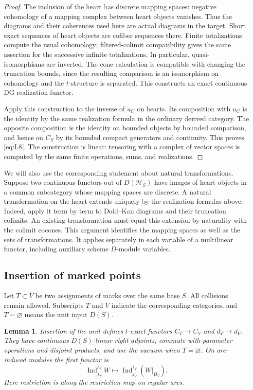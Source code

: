 \documentclass[11pt]{article}
\numberwithin{equation}{section}
\newtheorem{lemma}[theorem]{Lemma}
\theoremstyle{definition}
\theoremstyle{remark}
\begin{document}
\begin{proof}
The inclusion of the heart has discrete mapping spaces: negative
cohomology of a mapping complex between heart objects vanishes.
Thus the diagrams and their coherences used here are actual diagrams
in the target.  Short exact sequences of heart objects are cofiber
sequences there.  Finite totalizations compute the usual cohomology;
filtered-colimit compatibility gives the same assertion for the
successive infinite totalizations.  In particular, quasi-isomorphisms
are inverted.  The cone calculation is compatible with changing the
truncation bounds, since the resulting comparison is an isomorphism
on cohomology and the $t$-structure is separated.  This constructs an
exact continuous DG realization functor.

Apply this construction to the inverse of $u_C$ on hearts.  Its
composition with $u_C$ is the identity by the same realization formula
in the ordinary derived category.  The opposite composition is the
identity on bounded objects by bounded comparison, and hence on $C_S$
by its bounded compact generators and continuity.  This proves
\eqref{eq:L8}.  The construction is linear: tensoring with a complex
of vector spaces is computed by the same finite operations, sums,
and realizations.
\end{proof}

We will also use the corresponding statement about natural
transformations.  Suppose two continuous functors out of
$D(\mathcal H_S)$ have images of heart objects in a common subcategory
whose mapping spaces are discrete.  A natural transformation on the
heart extends uniquely by the realization formulas above.  Indeed,
apply it term by term to Dold--Kan diagrams and their truncation
colimits.  An existing transformation must equal this extension by
naturality with the colimit cocones.  This argument identifies the
mapping spaces as well as the sets of transformations.  It applies
separately in each variable of a multilinear functor, including
auxiliary scheme $D$-module variables.

\subsection{Insertion of marked points}

Let $T\subset V$ be two assignments of marks over the same base $S$.
All collisions remain allowed.  Subscripts $T$ and $V$ indicate the
corresponding categories, and $T=\varnothing$ means the unit input
$D(S)$.

\begin{lemma}\label{local:insertion}
Insertion of the unit defines $t$-exact functors
$C_T\to C_V$ and $d_T\to d_V$.  They have continuous $D(S)$-linear
right adjoints, commute with parameter operations and disjoint
products, and use the vacuum when $T=\varnothing$.
On arc-induced modules the first functor is
\begin{equation}\label{eq:L9}
 \operatorname{Ind}_{j_T}^{\ell_T}W
       \longmapsto
 \operatorname{Ind}_{j_V}^{\ell_V}(W|_{H_V}).
\end{equation}
Here restriction is along the restriction map on regular arcs.
\end{lemma}
\end{document}
